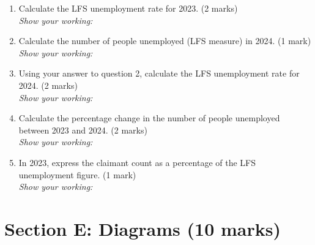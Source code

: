 \documentclass[12pt,a4paper]{article}
\begin{document}
\begin{enumerate}[leftmargin=*, label=\textbf{\arabic*.}]

    \item Calculate the LFS unemployment rate for 2023. \hfill (2 marks)\\[0.2em]
    \textit{Show your working:}
    \vspace{3cm}

    \item Calculate the number of people unemployed (LFS measure) in 2024. \hfill (1 mark)\\[0.2em]
    \textit{Show your working:}
    \vspace{2cm}

    \item Using your answer to question 2, calculate the LFS unemployment rate for 2024. \hfill (2 marks)\\[0.2em]
    \textit{Show your working:}
    \vspace{3cm}

    \item Calculate the percentage change in the number of people unemployed between 2023 and 2024. \hfill (2 marks)\\[0.2em]
    \textit{Show your working:}
    \vspace{3cm}

    \item In 2023, express the claimant count as a percentage of the LFS unemployment figure. \hfill (1 mark)\\[0.2em]
    \textit{Show your working:}
    \vspace{2cm}

\end{enumerate}

\newpage

\section*{Section E: Diagrams (10 marks)}
\end{document}
